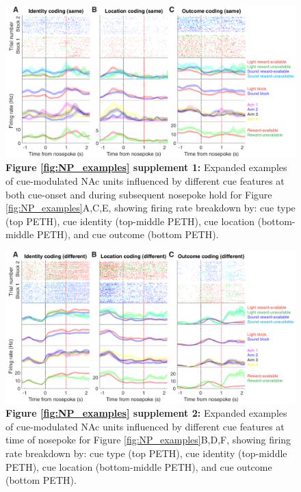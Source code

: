 \documentclass[11pt]{article}
\newcommand{\bsf}[1]{\textbf{#1}}
\begin{document}
 \begin{figure}[ht!]
\centering
\includegraphics[width=\textwidth]{Fig 6 - NP Neural examples SUPP1.pdf}
\caption*{\bsf{Figure \ref{fig:NP_examples} supplement 1:} Expanded examples of cue-modulated NAc units influenced by different cue features at both cue-onset and during subsequent nosepoke hold for Figure \ref{fig:NP_examples}A,C,E, showing firing rate breakdown by: cue type (top PETH), cue identity (top-middle PETH), cue location (bottom-middle PETH), and cue outcome (bottom PETH).}
\label{fig:NP_examplesSUPP1}
\end{figure} \clearpage

 \begin{figure}[ht!]
\centering
\includegraphics[width=\textwidth]{Fig 6 - NP Neural examples SUPP2.pdf}
\caption*{\bsf{Figure \ref{fig:NP_examples} supplement 2:} Expanded examples of cue-modulated NAc units influenced by different cue features at time of nosepoke for Figure \ref{fig:NP_examples}B,D,F, showing firing rate breakdown by: cue type (top PETH), cue identity (top-middle PETH), cue location (bottom-middle PETH), and cue outcome (bottom PETH).}
\label{fig:NP_examplesSUPP2}
\end{figure} \clearpage
\end{document}

